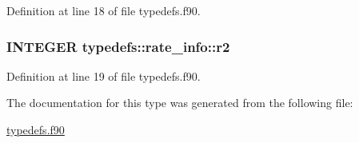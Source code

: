 Definition at line 18 of file typedefs.f90.\hypertarget{typetypedefs_1_1rate__info_a4fc3955386c2a940827c6d342f2a31db}{
\subsubsection[{r2}]{\setlength{\rightskip}{0pt plus 5cm}INTEGER {\bf typedefs::rate\_\-info::r2}}}
\label{typetypedefs_1_1rate__info_a4fc3955386c2a940827c6d342f2a31db}


Definition at line 19 of file typedefs.f90.

The documentation for this type was generated from the following file:\begin{DoxyCompactItemize}
\item 
\hyperlink{typedefs_8f90}{typedefs.f90}\end{DoxyCompactItemize}
